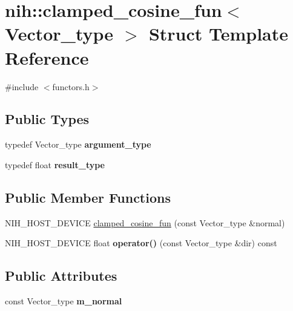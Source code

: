 \hypertarget{structnih_1_1clamped__cosine__fun}{
\section{nih\-:\-:clamped\-\_\-cosine\-\_\-fun$<$ \-Vector\-\_\-type $>$ \-Struct \-Template \-Reference}
\label{structnih_1_1clamped__cosine__fun}
}


{\ttfamily \#include $<$functors.\-h$>$}

\subsection*{\-Public \-Types}
\begin{DoxyCompactItemize}
\item 
\hypertarget{structnih_1_1clamped__cosine__fun_a48564a12b9657f1d4548679d7a33e6eb}{
typedef \-Vector\-\_\-type {\bfseries argument\-\_\-type}}
\label{structnih_1_1clamped__cosine__fun_a48564a12b9657f1d4548679d7a33e6eb}

\item 
\hypertarget{structnih_1_1clamped__cosine__fun_aa344a9403e7eb8e7c5917fdcd7480804}{
typedef float {\bfseries result\-\_\-type}}
\label{structnih_1_1clamped__cosine__fun_aa344a9403e7eb8e7c5917fdcd7480804}

\end{DoxyCompactItemize}
\subsection*{\-Public \-Member \-Functions}
\begin{DoxyCompactItemize}
\item 
\-N\-I\-H\-\_\-\-H\-O\-S\-T\-\_\-\-D\-E\-V\-I\-C\-E \hyperlink{structnih_1_1clamped__cosine__fun_a84b1ff420bf0e6e7ff652eb4c19a1ed9}{clamped\-\_\-cosine\-\_\-fun} (const \-Vector\-\_\-type \&normal)
\item 
\hypertarget{structnih_1_1clamped__cosine__fun_ae050d2c782c501271cf0d23b679b2dd6}{
\-N\-I\-H\-\_\-\-H\-O\-S\-T\-\_\-\-D\-E\-V\-I\-C\-E float {\bfseries operator()} (const \-Vector\-\_\-type \&dir) const }
\label{structnih_1_1clamped__cosine__fun_ae050d2c782c501271cf0d23b679b2dd6}

\end{DoxyCompactItemize}
\subsection*{\-Public \-Attributes}
\begin{DoxyCompactItemize}
\item 
\hypertarget{structnih_1_1clamped__cosine__fun_aa54d4ab9cac12ab1e1b8f8f01f982df7}{
const \-Vector\-\_\-type {\bfseries m\-\_\-normal}}
\label{structnih_1_1clamped__cosine__fun_aa54d4ab9cac12ab1e1b8f8f01f982df7}

\end{DoxyCompactItemize}



